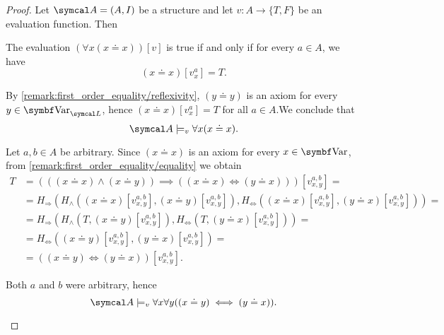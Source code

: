 \begin{proof}
  Let \( \Cal{A} = (A, I) \) be a structure and let \( v: A \to \{ T, F \} \) be an evaluation function. Then

  \begin{description}
     The evaluation \( (\forall x (x \doteq x))[v] \) is true if and only if for every \( a \in A \), we have
    \begin{equation*}
      (x \doteq x)[v_x^a] = T.
    \end{equation*}

    By \cref{remark:first_order_equality/reflexivity}, \( (y \doteq y) \) is an axiom for every \( y \in \Bold{Var}_{\Cal{L}} \), hence \mbox{\( (x \doteq x)[v_x^a] = T \)} for all \( a \in A \).We conclude that
    \begin{equation*}
      \Cal{A} \models_v \forall x (x \doteq x).
    \end{equation*}

     Let \( a, b \in A \) be arbitrary. Since \( (x \doteq x) \) is an axiom for every \( x \in \Bold{Var} \), from \cref{remark:first_order_equality/equality} we obtain
    \begin{align*}
      T &=
      (((x \doteq x) \land (x \doteq y)) \implies ((x \doteq x) \iff (y \doteq x)))[v_{x,y}^{a,b}]
      = \\ &=
      H_\Rightarrow(H_\land((x \doteq x)[v_{x,y}^{a,b}], (x \doteq y)[v_{x,y}^{a,b}]), H_\Leftrightarrow((x \doteq x)[v_{x,y}^{a,b}], (y \doteq x)[v_{x,y}^{a,b}]))
      = \\ &=
      H_\Rightarrow(H_\land(T, (x \doteq y)[v_{x,y}^{a,b}]), H_\Leftrightarrow(T, (y \doteq x)[v_{x,y}^{a,b}]))
      = \\ &=
      H_\Leftrightarrow((x \doteq y)[v_{x,y}^{a,b}], (y \doteq x)[v_{x,y}^{a,b}])
      = \\ &=
      ((x \doteq y) \iff (y \doteq x))[v_{x,y}^{a,b}].
    \end{align*}

    Both \( a \) and \( b \) were arbitrary, hence
    \begin{equation*}
      \Cal{A} \models_v \forall x \forall y ((x \doteq y) \iff (y \doteq x)).
    \end{equation*}


\end{description}
\end{proof}
